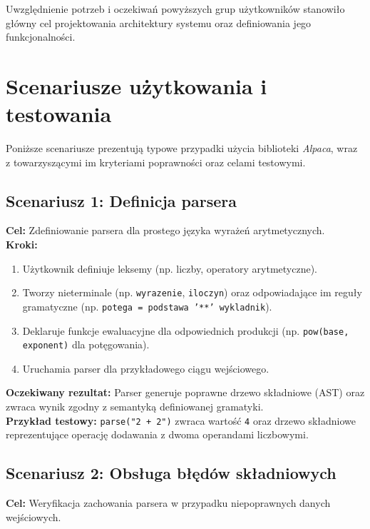 Uwzględnienie potrzeb i oczekiwań powyższych grup użytkowników stanowiło główny cel projektowania architektury systemu oraz definiowania jego funkcjonalności.

\section{Scenariusze użytkowania i testowania}
\label{sec:scenariusze-uzytkowania}

Poniższe scenariusze prezentują typowe przypadki użycia biblioteki \textit{Alpaca}, wraz z towarzyszącymi im kryteriami poprawności oraz celami testowymi.

\subsection*{Scenariusz 1: Definicja parsera}

\textbf{Cel:} Zdefiniowanie parsera dla prostego języka wyrażeń arytmetycznych.\\

\textbf{Kroki:}
\begin{enumerate}
    \item Użytkownik definiuje leksemy (np. liczby, operatory arytmetyczne).
    \item Tworzy nieterminale (np. \texttt{wyrazenie}, \texttt{iloczyn}) oraz odpowiadające im reguły gramatyczne (np. \texttt{potega = podstawa '**' wykladnik}).
    \item Deklaruje funkcje ewaluacyjne dla odpowiednich produkcji (np. \texttt{pow(base, exponent)} dla potęgowania).
    \item Uruchamia parser dla przykładowego ciągu wejściowego.
\end{enumerate}

\textbf{Oczekiwany rezultat:} Parser generuje poprawne drzewo składniowe (AST) oraz zwraca wynik zgodny z semantyką definiowanej gramatyki.\\

\textbf{Przykład testowy:} \texttt{parse("2 + 2")} zwraca wartość \texttt{4} oraz drzewo składniowe reprezentujące operację dodawania z dwoma operandami liczbowymi.

\subsection*{Scenariusz 2: Obsługa błędów składniowych}

\textbf{Cel:} Weryfikacja zachowania parsera w przypadku niepoprawnych danych wejściowych.\\

